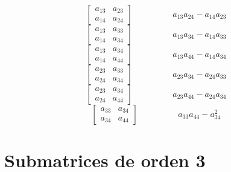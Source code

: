 \documentclass[12pt]{article}
\begin{document}
$$\left[\begin{matrix}a_{13} & a_{23}\\a_{14} & a_{24}\end{matrix}\right]\hspace{2cm} a_{13} a_{24} - a_{14} a_{23}$$   
$$\left[\begin{matrix}a_{13} & a_{33}\\a_{14} & a_{34}\end{matrix}\right]\hspace{2cm} a_{13} a_{34} - a_{14} a_{33}$$   
$$\left[\begin{matrix}a_{13} & a_{34}\\a_{14} & a_{44}\end{matrix}\right]\hspace{2cm} a_{13} a_{44} - a_{14} a_{34}$$   
$$\left[\begin{matrix}a_{23} & a_{33}\\a_{24} & a_{34}\end{matrix}\right]\hspace{2cm} a_{23} a_{34} - a_{24} a_{33}$$   
$$\left[\begin{matrix}a_{23} & a_{34}\\a_{24} & a_{44}\end{matrix}\right]\hspace{2cm} a_{23} a_{44} - a_{24} a_{34}$$   
$$\left[\begin{matrix}a_{33} & a_{34}\\a_{34} & a_{44}\end{matrix}\right]\hspace{2cm} a_{33} a_{44} - a_{34}^{2}$$

\section*{Submatrices de orden 3}
\end{document}
